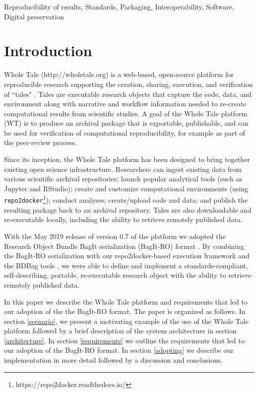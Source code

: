 \documentclass[conference]{IEEEtran}
\begin{document}
\begin{IEEEkeywords}
Reproducibility of results, Standards, Packaging, Interoperability, Software, Digital preservation
\end{IEEEkeywords}

\section{Introduction}

Whole Tale (http://wholetale.org) is a web-based, open-source platform for reproducible research 
supporting the creation, sharing, execution, and verification of ``tales" \cite{brinckman2019, chard2019}. Tales are executable research objects that capture the code, data, and environment along with narrative and workflow information needed to re-create computational results from scientific studies. A goal of the Whole Tale platform (WT) is to produce an archival package that is exportable, publishable, and can be used for verification of computational reproducibility, for example as part of the peer-review process.

Since its inception, the Whole Tale platform has been designed to bring together existing open 
science infrastructure.  Researchers can ingest existing data from various scientific archival 
repositories; launch popular analytical tools (such as Jupyter and RStudio); create and customize 
computational environments (using \texttt{repo2docker}\footnote{https://repo2docker.readthedocs.io/}); 
conduct analyses; create/upload code and data; and publish the resulting package back to an
archival repository. Tales are also downloadable and re-executable locally, including the 
ability to retrieve remotely published data.  

With the May 2019 release of version 0.7 of the platform we adopted the Research Object Bundle BagIt serialization (BagIt-RO) format \cite{soilandreyes2014}. By combining the BagIt-RO 
serialization with our repo2docker-based execution framework and the BDBag tools 
\cite{chard2016}, we were able to define and implement a standards-compliant, self-describing, 
portable, re-executable research object with the ability to retrieve remotely published data.  

In this paper we describe the Whole Tale platform and requirements that led to our adoption of the
the BagIt-RO format. The paper is organized as follows. In section \ref{scenario}, we present a 
motivating example of the  use of the Whole Tale platform followed by a brief description of the 
system architecture in section \ref{architecture}. In section \ref{requirements} we outline the 
requirements that led to our adoption of the BagIt-RO format. In section \ref{adopting} we describe
our implementation in more detail followed by a discussion and conclusions.
\end{document}
